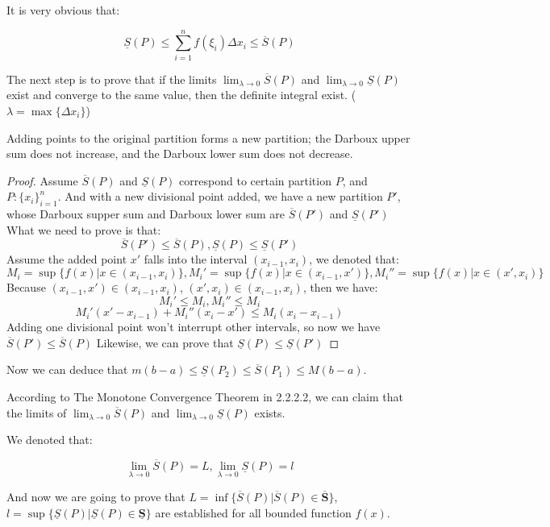 \documentclass[oneside]{book}
\begin{document}
It is very obvious that:

\[
\underline{S}(P) \leq \sum_{i=1}^{n} f(\xi_i) \Delta x_i \leq \overline{S}(P)
\]

The next step is to prove that if the limits $\lim_{\lambda \to 0} \overline{S}(P)$ and $\lim_{\lambda \to 0} \underline{S}(P)$ exist and converge to the same value, then the definite integral exist. ($\lambda = \max \{\Delta x_i\}$)

\begin{lemma}
Adding points to the original partition forms a new partition; the Darboux upper sum does not increase, and the Darboux lower sum does not decrease.
\end{lemma}

\begin{proof}
Assume $\overline{S}(P)$ and $\underline{S}(P)$ correspond to certain partition $P$, and $P: \{x_i\}_{i=1}^n$. And with a new divisional point added, we have a new partition $P'$, whose Darboux supper sum and Darboux lower sum are $\overline{S}(P')$ and $\underline{S}(P')$
What we need to prove is that:
\[
\overline{S}(P') \leq \overline{S}(P), \underline{S}(P) \leq \underline{S}(P')
\]
Assume the added point $x'$ falls into the interval $(x_{i-1},x_i)$, we denoted that:
\[
M_i = \sup \{f(x)|x \in (x_{i-1},x_i)\}, M_i' = \sup \{f(x)|x \in (x_{i-1},x')\}, M_i'' = \sup \{f(x)| x \in (x', x_i)\}
\]
Because $(x_{i-1},x') \in (x_{i-1},x_i)$, $(x', x_i) \in (x_{i-1},x_i)$, then we have:
\[
M_i' \leq M_i, M_i'' \leq M_i
\]
\[
M_i'(x'-x_{i-1}) + M_i''(x_i-x') \leq M_i(x_i - x_{i-1})
\]
Adding one divisional point won't interrupt other intervals, so now we have $\overline{S}(P') \leq \overline{S}(P)$
Likewise, we can prove that $\underline{S}(P) \leq \underline{S}(P')$

\end{proof}

Now we can deduce that $m(b-a) \leq \underline{S}(P_2) \leq \overline{S}(P_1) \leq M(b-a)$.

According to The Monotone Convergence Theorem in 2.2.2.2, we can claim that the limits of $\lim_{\lambda \to 0} \overline{S}(P)$ and $\lim_{\lambda \to 0} \underline{S}(P)$ exists.

We denoted that:

\[
\lim_{\lambda \to 0} \overline{S}(P)=L, \lim_{\lambda \to 0} \underline{S}(P)=l
\]

And now we are going to prove that $L = \inf \{\overline{S}(P)|\overline{S}(P) \in \overline{\textbf{S}}\}$, $l = \sup \{\underline{S}(P)|\underline{S}(P) \in \underline{\textbf{S}}\}$ are established for all bounded function $f(x)$.
\end{document}
